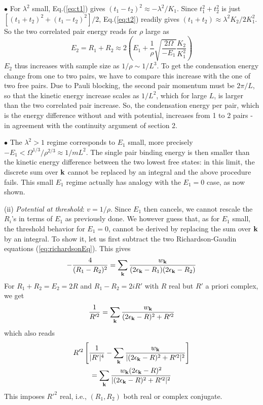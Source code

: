\documentclass[5p,twocolumn]{elsarticle}
\begin{document}
$\bullet$ For $\lambda^{2}$ small, Eq.(\ref{eq:t1}) gives $(t_{1}-t_{2})^{2}\approx-\lambda^{2}/K_{1}$. Since $t_{1}^{2}+t_{2}^{2}$ is just $\left[(t_{1}+t_{2})^{2}+(t_{1}-t_{2})^{2}\right]/2$,  Eq.(\ref{eq:t2}) readily gives $(t_{1}+t_{2})\approx\lambda^{2}K_{2}/2K_{1}^{2}$.  So the two correlated pair energy  reads for $\rho$ large as 
\begin{equation}
E_{2}=R_{1}+R_{2}\approx2\left(E_{1}+\frac{1}{\rho}\sqrt{\frac{2\Omega}{-E_{1}}}\frac{K_{2}}{K_{1}^{2}}\right)
\end{equation}
$E_{2}$ thus increases with sample size as $1/\rho\sim1/L^{3}$.
To get the condensation energy change from one to two pairs, we have to compare this increase with the one of two free pairs.  Due to Pauli blocking, the second pair momentum must be $2\pi/L$, so that the kinetic energy increase scales as $1/L^{2}$, which for large $L$, is larger than the two correlated pair increase. 
So, the condensation energy per pair, which is the energy difference without and with potential, increases from 1 to 2 pairs - in agreement with the continuity argument of section 2. 

 $\bullet$ The $\lambda^{2}>1$ regime corresponds to $E_{1}$ small, more precisely $-E_{1}<\Omega^{1/3}/\rho^{2/3}\approx1/mL^{2}$.  The single pair binding energy is then smaller than the kinetic energy difference between the two lowest free states: in this limit, the discrete sum over $\mathbf{k}$ cannot be replaced by an integral and the above procedure fails.  This small $E_1$ regime  actually has analogy with the $E_1=0$ case, as now shown. 


(ii) {\it Potential at threshold}: $v=1/\rho$. Since $E_1$ then cancels, we cannot rescale the $R_i$'s in terms of $E_1$ as previously done. We however guess that, as for $E_1$ small, the threshold behavior for $E_1=0$, cannot be derived by replacing the sum over $\mathbf{k}$ by an integral.
To show it, let us first subtract the two Richardson-Gaudin equations (\ref{eq:richardsonEq}). This gives
\begin{equation}
-\frac{4}{(R_1-R_2)^2}=\sum_{\mathbf{k}}\frac{w_{\mathbf{k}}}{(2\epsilon_{\mathbf{k}}-R_1)(2\epsilon_{\mathbf{k}}-R_2)}\label{eq:2PairMinus}
\end{equation}
For $R_1+R_2=E_2=2R$ and $R_1-R_2=2iR'$ with $R$ real but $R'$ a priori complex, we get
\begin{equation}
\frac{1}{R'^2}=\sum_{\mathbf{k}}\frac{w_{\mathbf{k}}}{(2\epsilon_{\mathbf{k}}-R)^2+R'^2}
\end{equation}
which also reads 
\begin{multline}
R'^{2}\left[\frac{1}{|R'|^{4}}-\sum_{\mathbf{k}}\frac{w_{\mathbf{k}}}{|(2\epsilon_{\mathbf{k}}-R)^{2}+R'^{2}|^{2}}\right]\\
=\sum_{\mathbf{k}}\frac{w_{\mathbf{k}}(2\epsilon_{\mathbf{k}}-R)^{2}}{|(2\epsilon_{\mathbf{k}}-R)^{2}+R'^{2}|^{2}}
\end{multline}
This imposes $R'^2$ real, i.e., $(R_1,R_2)$ both real or complex conjugate.
\end{document}
